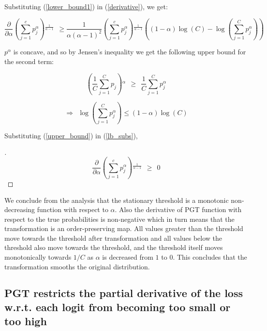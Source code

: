 \documentclass[times,sort&compress]{elsarticle}
\begin{document}
Substituting (\ref{lower_bound1}) in (\ref{derivative}), we get:

\begin{equation} \frac{\partial }{\partial \alpha} \left(\sum
_{j=1}^c p_j^{\alpha}\right){}^{\frac{1}{\alpha -1}}\ \ \geq
\frac{1}{\alpha  (\alpha -1)^2} \left(\sum _{j=1}^c
p_j^{\alpha}\right){}^{\frac{1}{\alpha -1}} \left((1-\alpha )
\log (C)-\log \left(\sum _{j=1}^C p_j^{\alpha }\right)\right)
\label{lb_subs} \end{equation}

$p^{\alpha}$ is concave, and so by Jensen's inequality we get the following upper bound
for the second term:

\begin{equation} \left(\frac{1}{C}{\sum _{j=1}^C
p_j}{}\right){}^{\alpha }\ \ \geq\ \ \frac{1}{C}{\sum _{j=1}^C
p_j^{\alpha }}{} \end{equation}

\begin{equation}\Rightarrow\ \ \log \left(\sum _{j=1}^C p_j^{\alpha}\right)\leq
(1-\alpha ) \log (C) \label{upper_bound} \end{equation}

Substituting (\ref{upper_bound}) in (\ref{lb_subs}),

\begin{proof}[\unskip\nopunct] \begin{equation} \frac{\partial}{\partial \alpha
}\left(\sum _{j=1}^c p_j^{\alpha}\right){}^{\frac{1}{\alpha -1}}\ \ \geq \ \ 0
\end{equation} \end{proof}



We conclude from the analysis that the stationary threshold is a monotonic
non-decreasing function with respect to $\alpha$. Also the derivative of PGT function
with respect to the true probabilities is non-negative which in turn means that the
transformation is an order-preserving map. All values greater than the threshold move
towards the threshold after transformation and all values below the threshold also move
towards the threshold, and the threshold itself moves monotonically towards $1/C$ as
$\alpha$ is decreased from $1$ to $0$. This concludes that the transformation smooths
the original distribution.









\subsection{PGT restricts the partial derivative of the loss w.r.t. each logit from becoming too small or too high}
\label{sec:pgt_logit_derivative}
\end{document}
